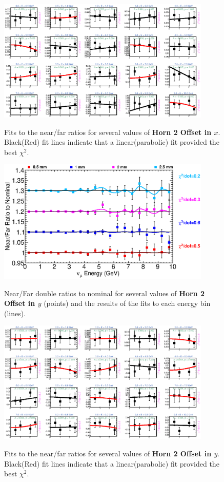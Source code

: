 \begin{figure}[hb]
  \begin{center}
    {\includegraphics[width=4.0in]{figures/Horn2XOffset_nof_fits.eps}}
  \end{center}
\caption{ Fits to the near/far ratios for several values of {\bf Horn 2 Offset in $x$}. Black(Red) fit lines indicate that a linear(parabolic) fit provided the best $\chi^2$. }
\end{figure}

\begin{figure}[ht]
  \begin{center}
    {\includegraphics[width=4.0in]{figures/Horn2YOffset_nof_summary.eps}}
  \end{center}
\caption{ Near/Far double ratios to nominal for several values of {\bf Horn 2 Offset in $y$} (points) and the results of the fits to each energy bin (lines).}
\end{figure}

\begin{figure}[hb]
  \begin{center}
    {\includegraphics[width=4.0in]{figures/Horn2YOffset_nof_fits.eps}}
  \end{center}
\caption{ Fits to the near/far ratios for several values of {\bf Horn 2 Offset in $y$}. Black(Red) fit lines indicate that a linear(parabolic) fit provided the best $\chi^2$. }
\end{figure}



